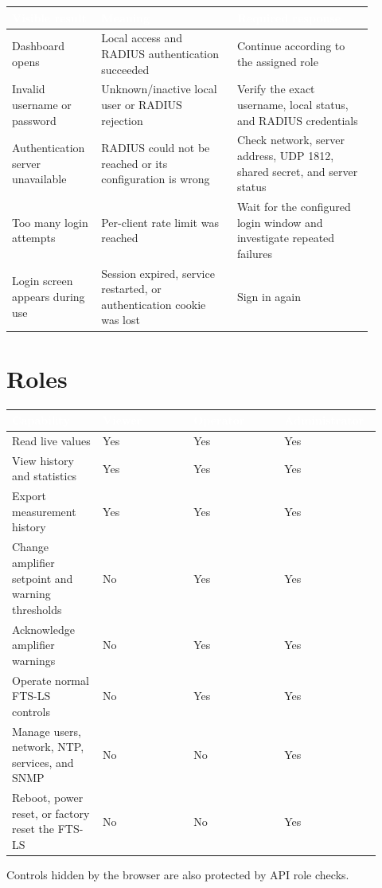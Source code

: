 \documentclass[11pt,a4paper,oneside]{book}
\newcommand{\thead}[1]{\cellcolor{panelblue}\textcolor{white}{\textbf{#1}}}
\begin{document}
\begin{longtable}{|>{\centering\arraybackslash}m{0.20\linewidth}|>{\centering\arraybackslash}m{0.35\linewidth}|>{\centering\arraybackslash}m{0.35\linewidth}|}
\hline
\thead{Visible result} & \thead{Meaning} & \thead{Required response} \\
\hline
\endhead
Dashboard opens & Local access and RADIUS authentication succeeded & Continue according to the assigned role \\
\hline
Invalid username or password & Unknown/inactive local user or RADIUS rejection & Verify the exact username, local status, and RADIUS credentials \\
\hline
Authentication server unavailable & RADIUS could not be reached or its configuration is wrong & Check network, server address, UDP 1812, shared secret, and server status \\
\hline
Too many login attempts & Per-client rate limit was reached & Wait for the configured login window and investigate repeated failures \\
\hline
Login screen appears during use & Session expired, service restarted, or authentication cookie was lost & Sign in again \\
\hline
\end{longtable}
\section{Roles}
\begin{longtable}{|>{\centering\arraybackslash}m{0.23\linewidth}|>{\centering\arraybackslash}m{0.23\linewidth}|>{\centering\arraybackslash}m{0.23\linewidth}|>{\centering\arraybackslash}m{0.23\linewidth}|}
\hline
\thead{Capability} & \thead{Viewer} & \thead{Operator} & \thead{Administrator} \\
\hline
\endhead
Read live values & Yes & Yes & Yes \\
\hline
View history and statistics & Yes & Yes & Yes \\
\hline
Export measurement history & Yes & Yes & Yes \\
\hline
Change amplifier setpoint and warning thresholds & No & Yes & Yes \\
\hline
Acknowledge amplifier warnings & No & Yes & Yes \\
\hline
Operate normal FTS-LS controls & No & Yes & Yes \\
\hline
Manage users, network, NTP, services, and SNMP & No & No & Yes \\
\hline
Reboot, power reset, or factory reset the FTS-LS & No & No & Yes \\
\hline
\end{longtable}
Controls hidden by the browser are also protected by API role checks.
\end{document}
